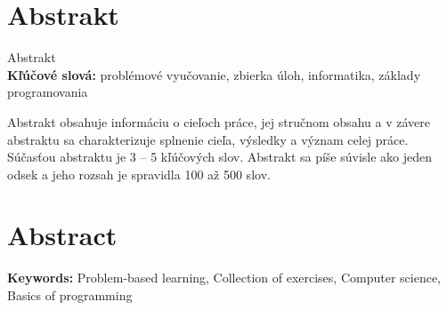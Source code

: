 \thispagestyle{empty}
\section*{Abstrakt}
Abstrakt \\
\textbf{Kľúčové slová:} problémové vyučovanie, zbierka úloh, informatika, základy programovania

Abstrakt obsahuje informáciu o cieľoch práce, jej stručnom obsahu a v závere abstraktu sa charakterizuje splnenie cieľa, výsledky a význam celej práce. Súčasťou abstraktu je 3 – 5 kľúčových slov. Abstrakt sa píše súvisle ako jeden odsek a jeho rozsah je spravidla 100 až 500 slov. 
\emptypage

\thispagestyle{empty}
\section*{Abstract}

\textbf{Keywords:} Problem-based learning, Collection of exercises, Computer science, Basics of programming  
\emptypage 